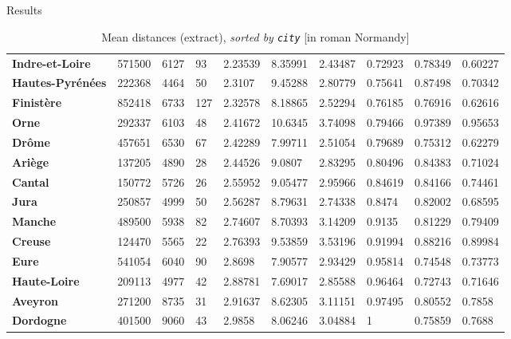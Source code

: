 \begin{frame}{Results}
\begin{table}[!ht]
\begin{tabular}{l|lllllllll}
                \textbf{Indre-et-Loire} & 571500 & 6127 & 93 & 2.23539 & 8.35991 & 2.43487 & 0.72923 & 0.78349 & 0.60227 \\ 
                \textbf{Hautes-Pyrénées} & 222368 & 4464 & 50 & 2.3107 & 9.45288 & 2.80779 & 0.75641 & 0.87498 & 0.70342 \\ 
                \textbf{Finistère} & 852418 & 6733 & 127 & 2.32578 & 8.18865 & 2.52294 & 0.76185 & 0.76916 & 0.62616 \\ 
                
                \textrm{\textbf{Orne}} & 292337 & 6103 & 48 & 2.41672 & 10.6345 & 3.74098 & 0.79466 & 0.97389 & 0.95653 \\ 
                \textbf{Drôme} & 457651 & 6530 & 67 & 2.42289 & 7.99711 & 2.51054 & 0.79689 & 0.75312 & 0.62279 \\ 
                \textbf{Ariège} & 137205 & 4890 & 28 & 2.44526 & 9.0807 & 2.83295 & 0.80496 & 0.84383 & 0.71024 \\ 
                
                \textbf{Cantal} & 150772 & 5726 & 26 & 2.55952 & 9.05477 & 2.95966 & 0.84619 & 0.84166 & 0.74461 \\ 
                \textbf{Jura} & 250857 & 4999 & 50 & 2.56287 & 8.79631 & 2.74338 & 0.8474 & 0.82002 & 0.68595 \\ 
                
                \textrm{\textbf{Manche}} & 489500 & 5938 & 82 & 2.74607 & 8.70393 & 3.14209 & 0.9135 & 0.81229 & 0.79409 \\ 
                \textbf{Creuse} & 124470 & 5565 & 22 & 2.76393 & 9.53859 & 3.53196 & 0.91994 & 0.88216 & 0.89984 \\ 
                
                \textrm{\textbf{Eure}} & 541054 & 6040 & 90 & 2.8698 & 7.90577 & 2.93429 & 0.95814 & 0.74548 & 0.73773 \\ 
                \textbf{Haute-Loire} & 209113 & 4977 & 42 & 2.88781 & 7.69017 & 2.85588 & 0.96464 & 0.72743 & 0.71646 \\ 
                \textbf{Aveyron} & 271200 & 8735 & 31 & 2.91637 & 8.62305 & 3.11151 & 0.97495 & 0.80552 & 0.7858 \\ 
                
                \textbf{Dordogne} & 401500 & 9060 & 43 & 2.9858 & 8.06246 & 3.04884 & 1 & 0.75859 & 0.7688 \\ 
            \end{tabular}
            \caption{Mean distances (extract), \emph{sorted by \texttt{city}} [in roman \textrm{Normandy}]}
        \end{table}
\end{frame}